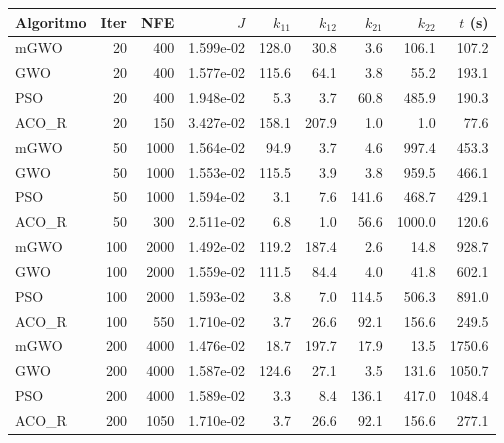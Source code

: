 \begin{tabular}{lrrrrrrrr}
\hline
Algoritmo & Iter & NFE & $J$ & $k_{11}$ & $k_{12}$ & $k_{21}$ & $k_{22}$ & $t$ (s) \\
\hline
mGWO & 20 & 400 & 1.599e-02 & 128.0 & 30.8 & 3.6 & 106.1 & 107.2 \\
GWO & 20 & 400 & 1.577e-02 & 115.6 & 64.1 & 3.8 & 55.2 & 193.1 \\
PSO & 20 & 400 & 1.948e-02 & 5.3 & 3.7 & 60.8 & 485.9 & 190.3 \\
ACO\_R & 20 & 150 & 3.427e-02 & 158.1 & 207.9 & 1.0 & 1.0 & 77.6 \\
mGWO & 50 & 1000 & 1.564e-02 & 94.9 & 3.7 & 4.6 & 997.4 & 453.3 \\
GWO & 50 & 1000 & 1.553e-02 & 115.5 & 3.9 & 3.8 & 959.5 & 466.1 \\
PSO & 50 & 1000 & 1.594e-02 & 3.1 & 7.6 & 141.6 & 468.7 & 429.1 \\
ACO\_R & 50 & 300 & 2.511e-02 & 6.8 & 1.0 & 56.6 & 1000.0 & 120.6 \\
mGWO & 100 & 2000 & 1.492e-02 & 119.2 & 187.4 & 2.6 & 14.8 & 928.7 \\
GWO & 100 & 2000 & 1.559e-02 & 111.5 & 84.4 & 4.0 & 41.8 & 602.1 \\
PSO & 100 & 2000 & 1.593e-02 & 3.8 & 7.0 & 114.5 & 506.3 & 891.0 \\
ACO\_R & 100 & 550 & 1.710e-02 & 3.7 & 26.6 & 92.1 & 156.6 & 249.5 \\
mGWO & 200 & 4000 & 1.476e-02 & 18.7 & 197.7 & 17.9 & 13.5 & 1750.6 \\
GWO & 200 & 4000 & 1.587e-02 & 124.6 & 27.1 & 3.5 & 131.6 & 1050.7 \\
PSO & 200 & 4000 & 1.589e-02 & 3.3 & 8.4 & 136.1 & 417.0 & 1048.4 \\
ACO\_R & 200 & 1050 & 1.710e-02 & 3.7 & 26.6 & 92.1 & 156.6 & 277.1 \\
\hline
\end{tabular}
